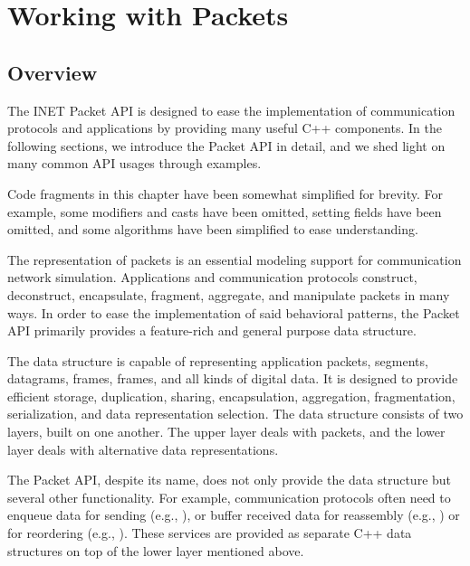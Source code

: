 \chapter{Working with Packets}
\label{cha:packet-api}

\section{Overview}

The INET Packet API is designed to ease the implementation of communication
protocols and applications by providing many useful C++ components. In the
following sections, we introduce the Packet API in detail, and we shed light on
many common API usages through examples.

\begin{note}
Code fragments in this chapter have been somewhat simplified for brevity. For
example, some  modifiers and  casts have been omitted,
setting fields have been omitted, and some algorithms have been simplified to
ease understanding.
\end{note}

The representation of packets is an essential modeling support for communication
network simulation. Applications and communication protocols construct,
deconstruct, encapsulate, fragment, aggregate, and manipulate packets in many
ways. In order to ease the implementation of said behavioral patterns, the
Packet API primarily provides a feature-rich and general purpose
 data structure.

The  data structure is capable of representing application
packets,  segments,  datagrams, 
frames,  frames, and all kinds of digital data. It is
designed to provide efficient storage, duplication, sharing, encapsulation,
aggregation, fragmentation, serialization, and data representation selection.
The  data structure consists of two layers, built on one
another. The upper layer deals with packets, and the lower layer deals with
alternative data representations.

The Packet API, despite its name, does not only provide the 
data structure but several other functionality. For example, communication
protocols often need to enqueue data for sending (e.g., ), or
buffer received data for reassembly (e.g., ) or for reordering
(e.g., ). These services are provided as separate C++ data
structures on top of the lower layer mentioned above.

